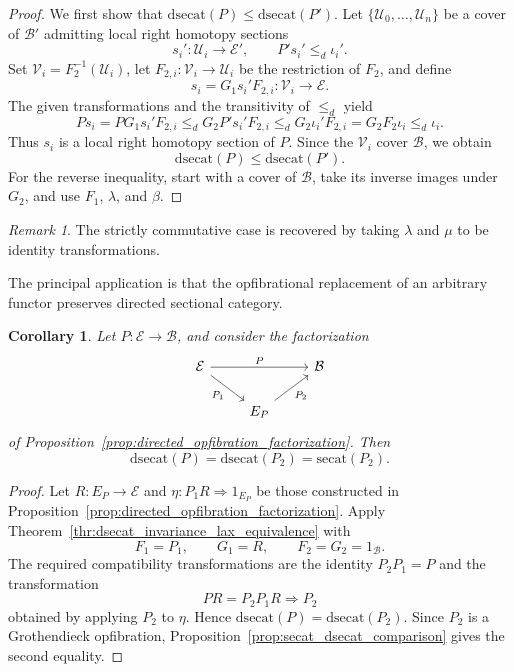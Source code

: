\documentclass[12pt]{amsart}
\newtheorem{corollary}[teo]{Corollary}
\theoremstyle{definition}
\theoremstyle{remark}
\newtheorem{remark}{Remark}
\numberwithin{figure}{section}%
\newcommand{\Ba}{\mathcal{B}}
\newcommand{\E}{\mathcal{E}}
\newcommand{\Uc}{\mathcal{U}}
\newcommand{\Vc}{\mathcal{V}}
\begin{document}
\begin{proof}
We first show that
\(\mathrm{dsecat}(P)\leq\mathrm{dsecat}(P')\). Let
\(\{\Uc_0,\ldots,\Uc_n\}\) be a cover of \(\Ba'\) admitting local right
homotopy sections
\[
s_i'\colon\Uc_i\longrightarrow\E',
\qquad
P's_i'\leq_d\iota_i'.
\]
Set \(\Vc_i=F_2^{-1}(\Uc_i)\), let
\(F_{2,i}\colon\Vc_i\to\Uc_i\) be the restriction of \(F_2\), and define
\[
s_i=G_1s_i'F_{2,i}\colon\Vc_i\longrightarrow\E.
\]
The given transformations and the transitivity of \(\leq_d\) yield
\[
Ps_i=PG_1s_i'F_{2,i}
\leq_d
G_2P's_i'F_{2,i}
\leq_d
G_2\iota_i'F_{2,i}
=
G_2F_2\iota_i
\leq_d
\iota_i.
\]
Thus \(s_i\) is a local right homotopy section of \(P\). Since the
\(\Vc_i\) cover \(\Ba\), we obtain
\[
\mathrm{dsecat}(P)\leq\mathrm{dsecat}(P').
\]
For the reverse inequality, start with a cover of \(\Ba\), take its
inverse images under \(G_2\), and use \(F_1\), \(\lambda\), and \(\beta\).
\end{proof}

\begin{remark}
The strictly commutative case is recovered by taking \(\lambda\) and
\(\mu\) to be identity transformations.
\end{remark}

The principal application is that the opfibrational replacement of an
arbitrary functor preserves directed sectional category. 

\begin{corollary}\label{cor:dsecat_opfibration_factorization}
Let \(P\colon\E\to\Ba\), and consider the factorization
\[
\begin{tikzcd}
\E \arrow[rr, "P"] \arrow[dr, "P_1"'] &&
\Ba \\
& E_P \arrow[ur, "P_2"'] &
\end{tikzcd}
\]
of Proposition~\ref{prop:directed_opfibration_factorization}. Then
\[
\mathrm{dsecat}(P)
=
\mathrm{dsecat}(P_2)
=
\mathrm{secat}(P_2).
\]
\end{corollary}

\begin{proof}
Let \(R\colon E_P\to\E\) and
\(\eta\colon P_1R\Rightarrow1_{E_P}\) be those constructed in
Proposition~\ref{prop:directed_opfibration_factorization}. Apply
Theorem~\ref{thr:dsecat_invariance_lax_equivalence} with
\[
F_1=P_1,\qquad
G_1=R,\qquad
F_2=G_2=1_\Ba.
\]
The required compatibility transformations are the identity
\(P_2P_1=P\) and the transformation
\[
PR=P_2P_1R\Rightarrow P_2
\]
obtained by applying \(P_2\) to \(\eta\). Hence
\(\mathrm{dsecat}(P)=\mathrm{dsecat}(P_2)\). Since \(P_2\) is a
Grothendieck opfibration, Proposition~\ref{prop:secat_dsecat_comparison}
gives the second equality.
\end{proof}
\end{document}

